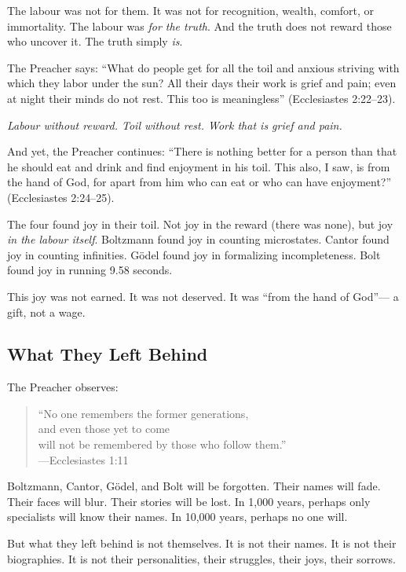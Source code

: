 \documentclass[11pt,a4paper]{article}
\begin{document}
The labour was not for them. It was not for recognition, wealth, comfort, or 
immortality. The labour was \emph{for the truth}. And the truth does not 
reward those who uncover it. The truth simply \emph{is}.

The Preacher says: ``What do people get for all the toil and anxious striving 
with which they labor under the sun? All their days their work is grief and 
pain; even at night their minds do not rest. This too is meaningless'' 
(Ecclesiastes 2:22--23).

\emph{Labour without reward. Toil without rest. Work that is grief and pain.}

And yet, the Preacher continues: ``There is nothing better for a person than 
that he should eat and drink and find enjoyment in his toil. This also, I saw, 
is from the hand of God, for apart from him who can eat or who can have 
enjoyment?'' (Ecclesiastes 2:24--25).

The four found joy in their toil. Not joy in the reward (there was none), but 
joy \emph{in the labour itself}. Boltzmann found joy in counting microstates. 
Cantor found joy in counting infinities. Gödel found joy in formalizing 
incompleteness. Bolt found joy in running 9.58 seconds.

This joy was not earned. It was not deserved. It was ``from the hand of God''—
a gift, not a wage.

\subsection{What They Left Behind}

The Preacher observes:

\begin{quote}
``No one remembers the former generations,\\
and even those yet to come\\
will not be remembered by those who follow them.''\\
\hfill---Ecclesiastes 1:11
\end{quote}

Boltzmann, Cantor, Gödel, and Bolt will be forgotten. Their names will fade. 
Their faces will blur. Their stories will be lost. In 1,000 years, perhaps 
only specialists will know their names. In 10,000 years, perhaps no one will.

But what they left behind is not themselves. It is not their names. It is not 
their biographies. It is not their personalities, their struggles, their joys, 
their sorrows.
\end{document}
